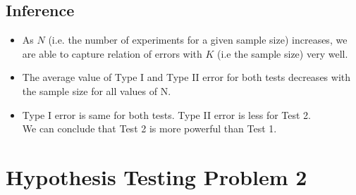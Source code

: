 \documentclass[fleqn, 11pt]{article}
\begin{document}
\subsection{Inference}
\begin{itemize}
    \item As $N$ (i.e. the number of experiments for a given sample size) increases, we are able to capture relation of errors with $K$ (i.e the sample size) very well.
    \item The average value of Type I and Type II error for both tests decreases with the sample size for all values of N.
    \item Type I error is same for both tests. Type II error is less for Test 2. \\
          We can conclude that Test 2 is more powerful than Test 1.
\end{itemize}


\newpage
\section{Hypothesis Testing Problem 2}
\setcounter{figure}{0}
\end{document}
